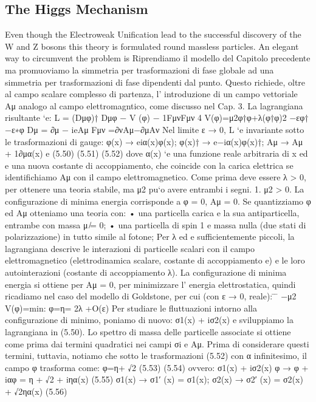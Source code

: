 \subsection{The Higgs Mechanism}
Even though the Electroweak Unification lead to the successful discovery of the W and Z bosons this theory is formulated round massless particles. An elegant way to circumvent the problem is 
Riprendiamo il modello del Capitolo precedente ma promuoviamo la simmetria per trasformazioni di fase globale ad una simmetria per trasformazioni di fase dipendenti dal punto. Questo richiede, oltre al campo scalare complesso di partenza, l’ introduzione di un campo vettoriale Aμ analogo al campo elettromagntico, come discusso nel Cap. 3. La lagrangiana risultante `e:
 L = (Dμφ)† Dμφ − V (φ) − 1FμνFμν 4
 V(φ)=μ2φ†φ+λ(φ†φ)2 −εφ† −ε∗φ 
 Dμ = ∂μ − ieAμ
Fμν =∂νAμ−∂μAν
 Nel limite ε → 0, L `e invariante sotto le trasformazioni di gauge:
 φ(x) → eiα(x)φ(x); φ(x)† → e−iα(x)φ(x)†;
Aμ → Aμ + 1∂μα(x) e
(5.50)
(5.51) (5.52)
  dove α(x) `e una funzione reale arbitraria di x ed e una nuova costante di accoppiamento, che coincide con la carica elettrica se identifichiamo Aμ con il campo elettromagnetico. Come prima deve essere λ > 0, per ottenere una teoria stabile, ma μ2 pu`o avere entrambi i segni.
1. μ2 > 0. La configurazione di minima energia corrisponde a φ = 0, Aμ = 0. Se quantizziamo φ ed Aμ otteniamo una teoria con:
• una particella carica e la sua antiparticella, entrambe con massa μ ̸= 0;
• una particella di spin 1 e massa nulla (due stati di polarizzazione) in tutto simile al fotone;
Per λ ed e sufficientemente piccoli, la lagrangiana descrive le interazioni di particelle scalari con il campo elettromagnetico (elettrodinamica scalare, costante di accoppiamento e) e le loro autointerazioni (costante di accoppiamento λ).
La configurazione di minima energia si ottiene per Aμ = 0, per minimizzare l’ energia elettrostatica, quindi ricadiamo nel caso del modello di Goldstone, per cui (con ε → 0, reale):
  ̄  ̄  −μ2 V(φ)=min: φ=η= 2λ +O(ε)
Per studiare le fluttuazioni intorno alla configurazione di minimo, poniamo di nuovo: σ1(x) + iσ2(x)
e sviluppiamo la lagrangiana in (5.50). Lo spettro di massa delle particelle associate si ottiene come prima dai termini quadratici nei campi σi e Aμ. Prima di considerare questi termini, tuttavia, notiamo che sotto le trasformazioni (5.52) con α infinitesimo, il campo φ trasforma come:
  φ=η+ √2
(5.53)
(5.54)
    ovvero:
σ1(x) + iσ2(x)
φ → φ + iαφ = η + √2 + iηα(x) (5.55)
σ1(x) → σ1′ (x) = σ1(x); σ2(x) → σ2′ (x) = σ2(x) + √2ηα(x) (5.56)
 
